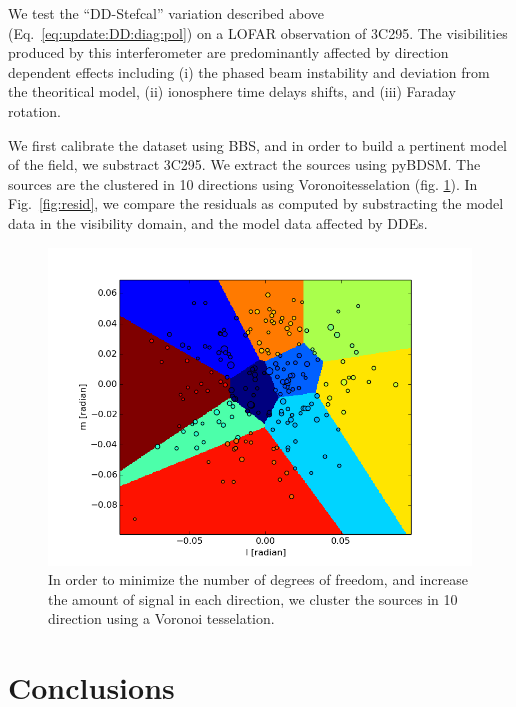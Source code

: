 \documentclass[useAMS,usenatbib]{mn2e}
\begin{document}
We test the ``DD-Stefcal'' variation described above (Eq.~\ref{eq:update:DD:diag:pol}) on a LOFAR observation of 3C295. The
visibilities produced by this interferometer are predominantly affected by direction dependent effects including (i) the 
phased beam instability and deviation from the
theoritical model, (ii) ionosphere time delays shifts, and (iii) Faraday rotation.

We first calibrate the dataset using BBS, and in order to build a pertinent model of the field, we substract 3C295. We extract the
sources using pyBDSM. The sources are the clustered in 10 directions using Voronoitesselation (fig. \ref{fig:tessel}). In Fig.~\ref{fig:resid}, we compare the residuals as
computed by substracting the model data in the visibility domain, and the model data affected by DDEs.




\begin{figure}[]
\begin{center}
\includegraphics[width=\columnwidth]{tessel}
\caption{\label{fig:tessel} In order to minimize the number of degrees
of freedom, and increase the amount of signal in each direction, we cluster the sources in 10 direction using a Voronoi
tesselation.}
\end{center}
\end{figure}



\label{sec:realdata}

\section*{Conclusions}
\end{document}

